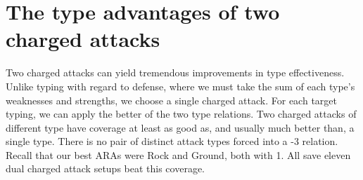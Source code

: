 \section{The type advantages of two charged attacks\label{sec:dualcharged}}
Two charged attacks can yield tremendous improvements in type effectiveness.
Unlike typing with regard to defense, where we must take the sum of each type's
 weaknesses and strengths, we choose a single charged attack.
For each target typing, we can apply the better of the two type relations.
Two charged attacks of different type have coverage at least as good as,
  and usually much better than, a single type.
There is no pair of distinct attack types forced into a -3 relation.
Recall that our best ARAs were Rock and Ground, both with 1.
All save eleven dual charged attack setups beat this coverage.

